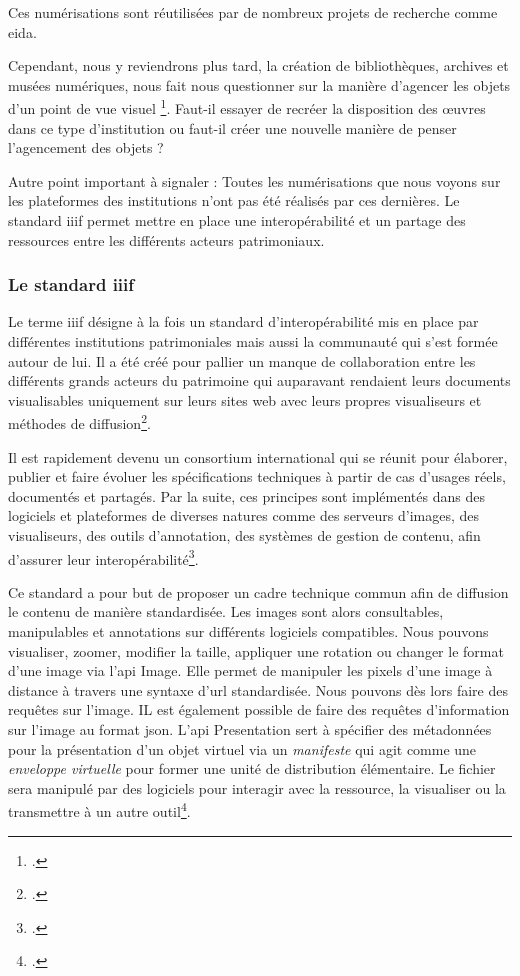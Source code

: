 Ces numérisations sont réutilisées par de nombreux projets de recherche comme \gls{eida}.

Cependant, nous y reviendrons plus tard, la création de bibliothèques, archives et musées numériques, nous fait nous questionner sur la manière d'agencer les objets d'un point de vue visuel \footcite{windhagerReviewInformationVisualization}. Faut-il essayer de recréer la disposition des œuvres dans ce type d'institution ou faut-il créer une nouvelle manière de penser l'agencement des objets ? 

Autre point important à signaler : Toutes les numérisations que nous voyons sur les plateformes des institutions n'ont pas été réalisés par ces dernières. Le standard \gls{iiif} permet mettre en place une interopérabilité et un partage des ressources entre les différents acteurs patrimoniaux. 

\subsubsection{Le standard \gls{iiif}} 

Le terme \gls{iiif} désigne à la fois un standard d'interopérabilité mis en place par différentes institutions patrimoniales mais aussi la communauté qui s'est formée autour de lui. Il a été créé pour pallier un manque de collaboration entre les différents grands acteurs du patrimoine qui auparavant rendaient leurs documents visualisables uniquement sur leurs sites web avec leurs propres visualiseurs et méthodes de diffusion\footcite{IIIFDocumentationBiblissima}.

Il est rapidement devenu un consortium international qui se réunit pour élaborer, publier et faire évoluer les spécifications techniques à partir de cas d'usages réels, documentés et partagés. Par la suite, ces principes sont implémentés dans des logiciels et plateformes de diverses natures comme des serveurs d'images, des visualiseurs, des outils d'annotation, des systèmes de gestion de contenu, afin d'assurer leur interopérabilité\footcite{charpierAtelierInitiationIIIF2024}.

Ce standard a pour but de proposer un cadre technique commun afin de diffusion le contenu de manière standardisée. Les images sont alors consultables, manipulables et annotations sur différents logiciels compatibles. Nous pouvons visualiser, zoomer, modifier la taille, appliquer une rotation ou changer le format d'une image via l'\gls{api} Image. Elle permet de manipuler les pixels d'une image à distance à travers une syntaxe d'\gls{url} standardisée. Nous pouvons dès lors faire des requêtes sur l'image. IL est également possible de faire des requêtes d'information sur l'image au format \gls{json}. L'\gls{api} Presentation sert à spécifier des métadonnées pour la présentation d'un objet virtuel via un \textit{manifeste} qui agit comme une \og \textit{enveloppe virtuelle} \fg pour former une unité de distribution élémentaire. Le fichier sera manipulé par des logiciels pour interagir avec la ressource, la visualiser ou la transmettre à un autre outil\footcite{IIIFDocumentationBiblissima}.

